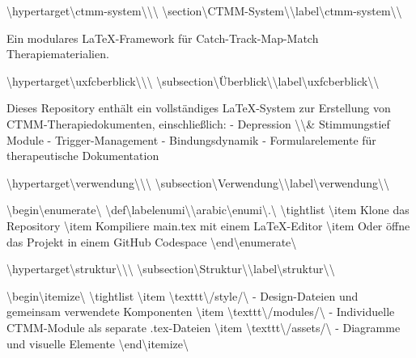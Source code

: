 \textbackslash{}hypertarget\textbackslash{}{ctmm-system\textbackslash{}}\textbackslash{}{\textbackslash{}%
\textbackslash{}section\textbackslash{}{CTMM-System\textbackslash{}}\textbackslash{}label\textbackslash{}{ctmm-system\textbackslash{}}\textbackslash{}}

Ein modulares LaTeX-Framework für Catch-Track-Map-Match Therapiematerialien.

\textbackslash{}hypertarget\textbackslash{}{uxfcberblick\textbackslash{}}\textbackslash{}{\textbackslash{}%
\textbackslash{}subsection\textbackslash{}{Überblick\textbackslash{}}\textbackslash{}label\textbackslash{}{uxfcberblick\textbackslash{}}\textbackslash{}}

Dieses Repository enthält ein vollständiges LaTeX-System zur Erstellung von CTMM-Therapiedokumenten, einschließlich:
- Depression \textbackslash{}\textbackslash{}& Stimmungstief Module
- Trigger-Management
- Bindungsdynamik
- Formularelemente für therapeutische Dokumentation

\textbackslash{}hypertarget\textbackslash{}{verwendung\textbackslash{}}\textbackslash{}{\textbackslash{}%
\textbackslash{}subsection\textbackslash{}{Verwendung\textbackslash{}}\textbackslash{}label\textbackslash{}{verwendung\textbackslash{}}\textbackslash{}}

\textbackslash{}begin\textbackslash{}{enumerate\textbackslash{}}
\textbackslash{}def\textbackslash{}labelenumi\textbackslash{}{\textbackslash{}arabic\textbackslash{}{enumi\textbackslash{}}.\textbackslash{}}
\textbackslash{}tightlist
\textbackslash{}item
  Klone das Repository
\textbackslash{}item
  Kompiliere main.tex mit einem LaTeX-Editor
\textbackslash{}item
  Oder öffne das Projekt in einem GitHub Codespace
\textbackslash{}end\textbackslash{}{enumerate\textbackslash{}}

\textbackslash{}hypertarget\textbackslash{}{struktur\textbackslash{}}\textbackslash{}{\textbackslash{}%
\textbackslash{}subsection\textbackslash{}{Struktur\textbackslash{}}\textbackslash{}label\textbackslash{}{struktur\textbackslash{}}\textbackslash{}}

\textbackslash{}begin\textbackslash{}{itemize\textbackslash{}}
\textbackslash{}tightlist
\textbackslash{}item
  \textbackslash{}texttt\textbackslash{}{/style/\textbackslash{}} - Design-Dateien und gemeinsam verwendete Komponenten
\textbackslash{}item
  \textbackslash{}texttt\textbackslash{}{/modules/\textbackslash{}} - Individuelle CTMM-Module als separate .tex-Dateien
\textbackslash{}item
  \textbackslash{}texttt\textbackslash{}{/assets/\textbackslash{}} - Diagramme und visuelle Elemente
\textbackslash{}end\textbackslash{}{itemize\textbackslash{}}

